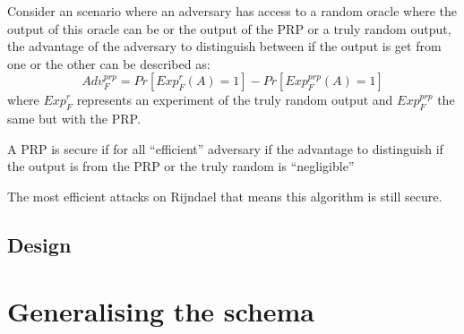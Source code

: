 \documentclass[a4paper,twoside]{llncs}
\begin{document}
Consider an scenario where an adversary has access to a random oracle where the output of this oracle can be or the output of the PRP or a truly random output, the advantage of the adversary to distinguish between if the output is get from one or the other can be described as:
\begin{equation}\label{eq:prpAdv}
 {Adv}_{F}^{prp} = Pr[{Exp}_{F}^{r}(A)=1]-Pr[{Exp}_{F}^{prp}(A)=1]
\end{equation}
where ${Exp}_{F}^{r}$ represents an experiment of the truly random output and ${Exp}_{F}^{prp}$ the same but with the PRP.

\begin{definition}\label{def:securePRP}
 A PRP is secure if for all ``efficient'' adversary if the advantage to distinguish if the output is from the PRP or the truly random is ``negligible''
\end{definition}

The most efficient attacks on Rijndael      that means this algorithm is still secure.


\subsection{Design}

\section{Generalising the schema}
\end{document}
